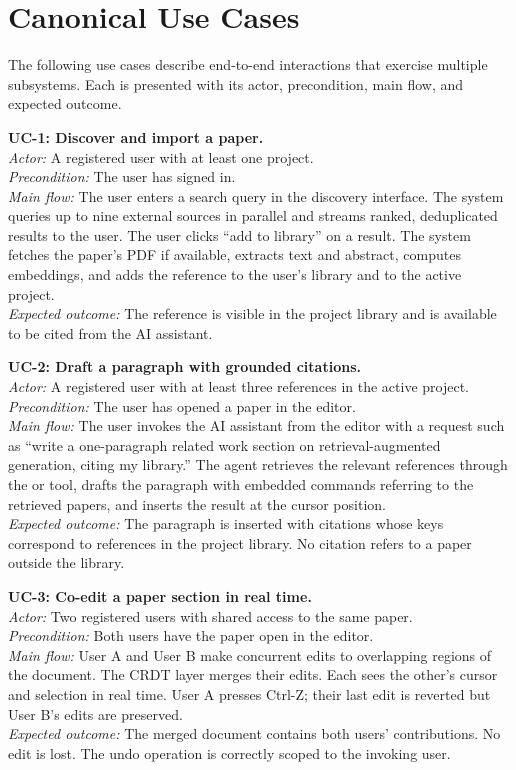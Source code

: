 \section{Canonical Use Cases}
\label{sec:req-usecases}

The following use cases describe end-to-end interactions that exercise multiple subsystems. Each is presented with its actor, precondition, main flow, and expected outcome.

\textbf{UC-1: Discover and import a paper.}\\
\textit{Actor:} A registered user with at least one project.\\
\textit{Precondition:} The user has signed in.\\
\textit{Main flow:} The user enters a search query in the discovery interface. The system queries up to nine external sources in parallel and streams ranked, deduplicated results to the user. The user clicks ``add to library'' on a result. The system fetches the paper's PDF if available, extracts text and abstract, computes embeddings, and adds the reference to the user's library and to the active project.\\
\textit{Expected outcome:} The reference is visible in the project library and is available to be cited from the AI assistant.

\textbf{UC-2: Draft a paragraph with grounded citations.}\\
\textit{Actor:} A registered user with at least three references in the active project.\\
\textit{Precondition:} The user has opened a paper in the editor.\\
\textit{Main flow:} The user invokes the AI assistant from the editor with a request such as ``write a one-paragraph related work section on retrieval-augmented generation, citing my library.'' The agent retrieves the relevant references through the  or  tool, drafts the paragraph with embedded  commands referring to the retrieved papers, and inserts the result at the cursor position.\\
\textit{Expected outcome:} The paragraph is inserted with citations whose keys correspond to references in the project library. No citation refers to a paper outside the library.

\textbf{UC-3: Co-edit a paper section in real time.}\\
\textit{Actor:} Two registered users with shared access to the same paper.\\
\textit{Precondition:} Both users have the paper open in the editor.\\
\textit{Main flow:} User A and User B make concurrent edits to overlapping regions of the document. The CRDT layer merges their edits. Each sees the other's cursor and selection in real time. User A presses Ctrl-Z; their last edit is reverted but User B's edits are preserved.\\
\textit{Expected outcome:} The merged document contains both users' contributions. No edit is lost. The undo operation is correctly scoped to the invoking user.

